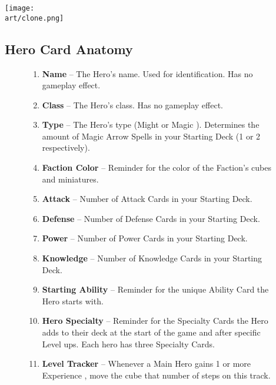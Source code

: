 \begin{multicols*}{2}
\vfill

\hspace{2em}
\texttt{[image: \\art/clone.png]}

\end{multicols*}

\clearpage

\subsection*{\hypertarget{Herocard}{Hero Card Anatomy}}
\bigbreak
\begin{figure}[h]
  \begin{minipage}[t]{0.5\textwidth}
    \vspace{0pt}
    \begin{enumerate}[itemsep=5pt]
      \item \textbf{Name} – The Hero's name.
        Used for identification.
        Has no gameplay effect.
      \item \textbf{Class} – The Hero's class.
        Has no gameplay effect.
      \item \textbf{Type} – The Hero's type (Might  or Magic ).
        Determines the amount of Magic Arrow Spells in your Starting Deck (1 or 2 respectively).
      \item \textbf{Faction Color} – Reminder for the color of the Faction's cubes and miniatures.
      \item \textbf{Attack} – Number of Attack Cards in your Starting Deck.
      \item \textbf{Defense} – Number of Defense Cards in your Starting Deck.
      \item \textbf{Power} – Number of Power Cards in your Starting Deck.
      \item \textbf{Knowledge} – Number of Knowledge Cards in your Starting Deck.
      \item \textbf{Starting Ability} – Reminder for the unique Ability Card the Hero starts with.
      \item \textbf{Hero Specialty} – Reminder for the Specialty Cards the Hero adds to their deck at the start of the game and after specific Level ups.
        Each hero has three Specialty Cards.
      \item \textbf{Level Tracker} – Whenever a Main Hero gains 1 or more Experience , move the cube that number of steps on this track.

\end{enumerate}
\end{minipage}
\end{figure}
